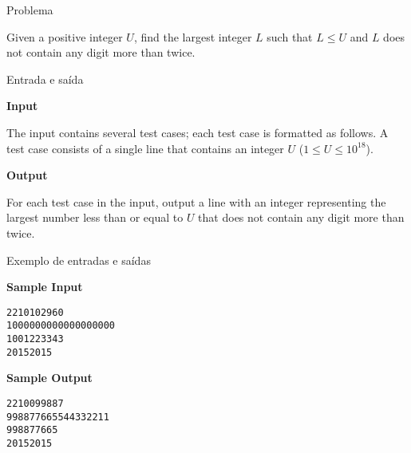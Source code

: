 
\begin{frame}[fragile]{Problema}

Given a positive integer $U$, find the largest integer $L$ such that $L\leq U$ and $L$ does not 
contain any digit more than twice.

\end{frame}

\begin{frame}[fragile]{Entrada e saída}

\textbf{Input}

The input contains several test cases; each test case is formatted as follows. A test case 
consists of a single line that contains an integer $U$ ($1\leq U\leq 10^{18}$).

\vspace{0.2in}

\textbf{Output}

For each test case in the input, output a line with an integer representing the largest number 
less than or equal to $U$ that does not contain any digit more than twice.

\end{frame}

\begin{frame}[fragile]{Exemplo de entradas e saídas}

\begin{minipage}[t]{0.45\textwidth}
\textbf{Sample Input}
\begin{verbatim}
2210102960
1000000000000000000
1001223343
20152015
\end{verbatim}
\end{minipage}
\begin{minipage}[t]{0.5\textwidth}
\textbf{Sample Output}
\begin{verbatim}
2210099887
998877665544332211
998877665
20152015
\end{verbatim}
\end{minipage}
\end{frame}

